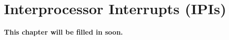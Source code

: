 
\chapter{Interprocessor Interrupts (IPIs)}
\label{ch:IPIs}

\textbf{This chapter will be filled in soon.}
